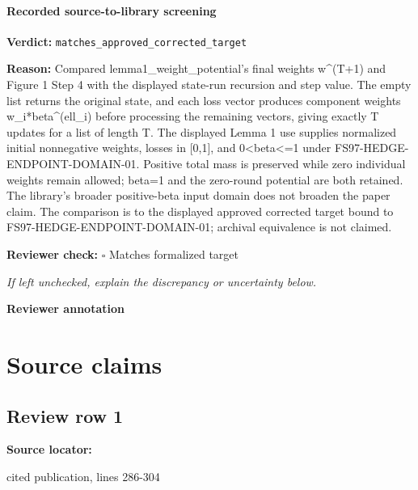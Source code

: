 \documentclass[10pt]{article}
\newcommand{\reviewerbox}{%
  \par\noindent\fbox{\parbox{0.96\linewidth}{\rule{0pt}{0.38in}}}\par
}
\newcommand{\reviewmatch}[1]{%
  \par\noindent\textbf{Reviewer check:} $\square$\; #1\par
  \noindent\emph{If left unchecked, explain the discrepancy or uncertainty below.}\par
}
\begin{document}
\paragraph{Recorded source-to-library screening}
\textbf{Verdict:} \texttt{matches\_approved\_corrected\_target}
\\
{\raggedright
\textbf{Reason:} Compared lemma1\_\allowbreak{}weight\_\allowbreak{}potential's final weights w\textasciicircum{}(T+1) and Figure 1 Step 4 with the displayed state-\allowbreak{}run recursion and step value.\allowbreak{} The empty list returns the original state, and each loss vector produces component weights w\_\allowbreak{}i*beta\textasciicircum{}(ell\_\allowbreak{}i) before processing the remaining vectors, giving exactly T updates for a list of length T.\allowbreak{} The displayed Lemma 1 use supplies normalized initial nonnegative weights, losses in [0,1], and 0<beta<=1 under FS97-\allowbreak{}HEDGE-\allowbreak{}ENDPOINT-\allowbreak{}DOMAIN-\allowbreak{}01.\allowbreak{} Positive total mass is preserved while zero individual weights remain allowed;\allowbreak{} beta=1 and the zero-\allowbreak{}round potential are both retained.\allowbreak{} The library's broader positive-\allowbreak{}beta input domain does not broaden the paper claim.\allowbreak{} The comparison is to the displayed approved corrected target bound to FS97-\allowbreak{}HEDGE-\allowbreak{}ENDPOINT-\allowbreak{}DOMAIN-\allowbreak{}01;\allowbreak{} archival equivalence is not claimed.\allowbreak{}
\par}
\reviewmatch{Matches formalized target}
\noindent\textbf{Reviewer annotation}\par
\reviewerbox

\clearpage
\hypertarget{source-claim-04236902ceef3985}{}
\hypertarget{source-section-f10b5f68e4acf3dc}{}
\section*{Source claims}
\subsection*{Review row 1}
\textbf{Source locator:} {\footnotesize\raggedright cited publication, lines 286-\allowbreak{}304\par}
\end{document}
